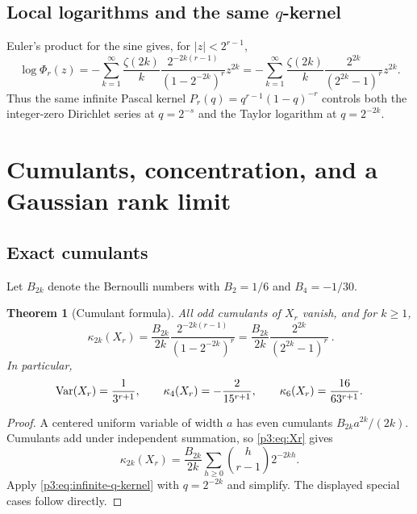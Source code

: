 \documentclass[11pt,oneside]{article}
\newtheorem{theorem}{Theorem}[section]
\theoremstyle{definition}
\theoremstyle{remark}
\begin{document}
\subsection{Local logarithms and the same \texorpdfstring{$q$}{q}-kernel}

Euler's product for the sine gives, for $|z|<2^{r-1}$,
\begin{equation}\label{p3:eq:log-phir}
 \log\Phi_r(z)
 =-\sum_{k=1}^{\infty}\frac{\zeta(2k)}{k}
   \frac{2^{-2k(r-1)}}{(1-2^{-2k})^r}z^{2k}
 =-\sum_{k=1}^{\infty}\frac{\zeta(2k)}{k}
   \frac{2^{2k}}{(2^{2k}-1)^r}z^{2k}.
\end{equation}
Thus the same infinite Pascal kernel $P_r(q)=q^{r-1}(1-q)^{-r}$ controls both the integer-zero Dirichlet series at $q=2^{-s}$ and the Taylor logarithm at $q=2^{-2k}$.

\section{Cumulants, concentration, and a Gaussian rank limit}\label{p3:sec:gaussian}

\subsection{Exact cumulants}

Let $B_{2k}$ denote the Bernoulli numbers with $B_2=1/6$ and $B_4=-1/30$.

\begin{theorem}[Cumulant formula]\label{p3:thm:cumulants}
All odd cumulants of $X_r$ vanish, and for $k\ge1$,
\begin{equation}\label{p3:eq:cumulant-r}
 \boxed{\ 
 \kappa_{2k}(X_r)
 =\frac{B_{2k}}{2k}
  \frac{2^{-2k(r-1)}}{(1-2^{-2k})^r}
 =\frac{B_{2k}}{2k}\frac{2^{2k}}{(2^{2k}-1)^r}
 \ }.
\end{equation}
In particular,
\begin{equation}\label{p3:eq:first-cumulants}
 \operatorname{Var}(X_r)=\frac1{3^{r+1}},
 \qquad
 \kappa_4(X_r)=-\frac2{15^{r+1}},
 \qquad
 \kappa_6(X_r)=\frac{16}{63^{r+1}}.
\end{equation}
\end{theorem}

\begin{proof}
A centered uniform variable of width $a$ has even cumulants
$B_{2k}a^{2k}/(2k)$.  Cumulants add under independent summation, so \eqref{p3:eq:Xr} gives
\[
 \kappa_{2k}(X_r)
 =\frac{B_{2k}}{2k}
  \sum_{h\ge0}\binom h{r-1}2^{-2kh}.
\]
Apply \eqref{p3:eq:infinite-q-kernel} with $q=2^{-2k}$ and simplify.  The displayed special cases follow directly.
\end{proof}
\end{document}
